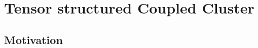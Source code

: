 \chapter{Tensor structured Coupled Cluster}
\label{ch:tcc} 


\section{Motivation}
\label{sec:Motivation} 

 